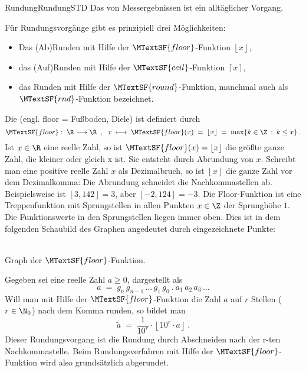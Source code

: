\begin{MXContent}{Rundung}{Rundung}{STD}
Das  von Messergebnissen ist ein alltäglicher Vorgang.

\begin{MInfo}
Für Rundungsvorgänge gibt es prinzipiell drei Möglichkeiten:
\begin{itemize}
\item{Das (Ab)Runden mit Hilfe der $\MTextSF{floor}$-Funktion $\left\lfloor{x}\right\rfloor$,}
\item{das (Auf)Runden mit Hilfe der $\MTextSF{ceil}$-Funktion $\left\lceil{ x}\right\rceil$,}
\item{das Runden mit Hilfe der $\MTextSF{round}$-Funktion, manchmal auch als $\MTextSF{rnd}$-Funktion bezeichnet.}
\end{itemize}
\end{MInfo}

Die  (engl. floor = Fußboden, Diele) ist definiert durch
$$
\MTextSF{floor}:\; \R\longrightarrow\R\;\; , \;\;
x\;\longmapsto\; \MTextSF{floor}(x)\;=\; \left\lfloor{x}\right\rfloor\;=\; \max\lbrace k\in\Z\: :\: k\leq x\rbrace\: .
$$
Ist $x\in\R$ eine reelle Zahl, so ist $\MTextSF{floor}(x)=\left\lfloor{ x}\right\rfloor$ die größte ganze Zahl, die kleiner oder gleich x ist.
Sie entsteht durch Abrundung von $x$. Schreibt man eine positive reelle Zahl $x$ als Dezimalbruch, so ist $\left\lfloor{ x}\right\rfloor$ die ganze Zahl vor dem
Dezimalkomma: Die Abrundung schneidet die Nachkommastellen ab. Beispielsweise ist $\left\lfloor{ 3,142}\right\rfloor=3$, aber $\left\lfloor{ -2,124}\right\rfloor=-3$.
Die Floor-Funktion ist eine Treppenfunktion mit Sprungstellen in allen Punkten $x\in \Z$ der Sprunghöhe $1$.
Die Funktionswerte in den Sprungstellen liegen immer oben. Dies ist in dem folgenden Schaubild des Graphen angedeutet durch eingezeichnete Punkte:

\begin{center}
\\
Graph der $\MTextSF{floor}$-Funktion.
\end{center}

Gegeben sei eine reelle Zahl $a\geq 0$, dargestellt als 
$$
a \;=\; g_n\, g_{n-1}\, \ldots\, g_1\, g_0\: .\: a_1\,a_2\, a_3\, \ldots
$$
Will man mit Hilfe der $\MTextSF{floor}$-Funktion die Zahl $a$ auf $r$ Stellen ($r\in\N_0$) nach dem Komma runden, so bildet man
$$
\tilde a \;=\; \frac1{10^r}\cdot \left\lfloor{ 10^r\cdot a}\right\rfloor\: .
$$
Dieser Rundungsvorgang ist die Rundung durch Abschneiden nach der r-ten Nachkommastelle. Beim Rundungsverfahren mit Hilfe der
$\MTextSF{floor}$-Funktion wird also grundsätzlich abgerundet.


\end{MXContent}
